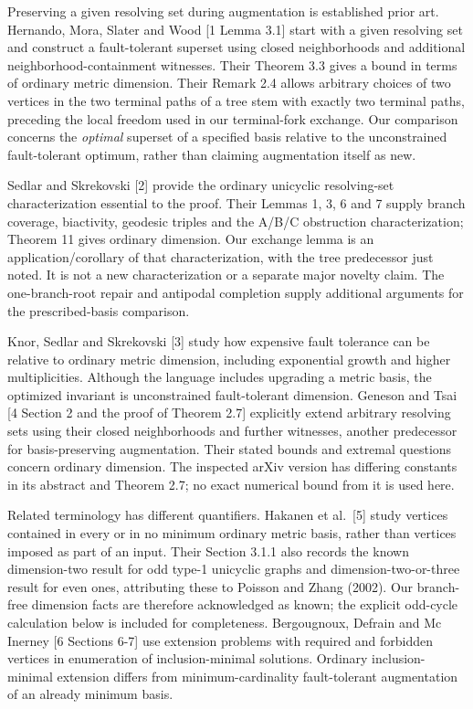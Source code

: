 \documentclass[
]{article}
\begin{document}
Preserving a given resolving set during augmentation is established
prior art. Hernando, Mora, Slater and Wood {[}1 Lemma 3.1{]} start with
a given resolving set and construct a fault-tolerant superset using
closed neighborhoods and additional neighborhood-containment witnesses.
Their Theorem 3.3 gives a bound in terms of ordinary metric dimension.
Their Remark 2.4 allows arbitrary choices of two vertices in the two
terminal paths of a tree stem with exactly two terminal paths, preceding
the local freedom used in our terminal-fork exchange. Our comparison
concerns the \emph{optimal} superset of a specified basis relative to
the unconstrained fault-tolerant optimum, rather than claiming
augmentation itself as new.

Sedlar and Skrekovski {[}2{]} provide the ordinary unicyclic
resolving-set characterization essential to the proof. Their Lemmas 1,
3, 6 and 7 supply branch coverage, biactivity, geodesic triples and the
A/B/C obstruction characterization; Theorem 11 gives ordinary dimension.
Our exchange lemma is an application/corollary of that characterization,
with the tree predecessor just noted. It is not a new characterization
or a separate major novelty claim. The one-branch-root repair and
antipodal completion supply additional arguments for the
prescribed-basis comparison.

Knor, Sedlar and Skrekovski {[}3{]} study how expensive fault tolerance
can be relative to ordinary metric dimension, including exponential
growth and higher multiplicities. Although the language includes
upgrading a metric basis, the optimized invariant is unconstrained
fault-tolerant dimension. Geneson and Tsai {[}4 Section 2 and the proof
of Theorem 2.7{]} explicitly extend arbitrary resolving sets using their
closed neighborhoods and further witnesses, another predecessor for
basis-preserving augmentation. Their stated bounds and extremal
questions concern ordinary dimension. The inspected arXiv version has
differing constants in its abstract and Theorem 2.7; no exact numerical
bound from it is used here.

Related terminology has different quantifiers. Hakanen et al.~{[}5{]}
study vertices contained in every or in no minimum ordinary metric
basis, rather than vertices imposed as part of an input. Their Section
3.1.1 also records the known dimension-two result for odd type-1
unicyclic graphs and dimension-two-or-three result for even ones,
attributing these to Poisson and Zhang (2002). Our branch-free dimension
facts are therefore acknowledged as known; the explicit odd-cycle
calculation below is included for completeness. Bergougnoux, Defrain and
Mc Inerney {[}6 Sections 6-7{]} use extension problems with required and
forbidden vertices in enumeration of inclusion-minimal solutions.
Ordinary inclusion-minimal extension differs from minimum-cardinality
fault-tolerant augmentation of an already minimum basis.
\end{document}
